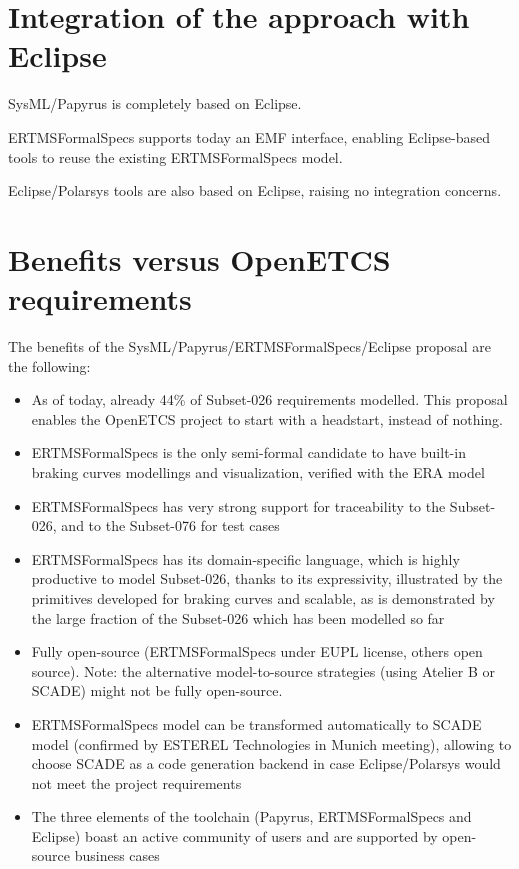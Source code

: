\section{Integration of the approach with Eclipse}

SysML/Papyrus is completely based on Eclipse.

ERTMSFormalSpecs supports today an EMF interface, enabling Eclipse-based tools to reuse the existing ERTMSFormalSpecs model. 

Eclipse/Polarsys tools are also based on Eclipse, raising no integration concerns.

\section{Benefits versus OpenETCS requirements}

The benefits of the SysML/Papyrus/ERTMSFormalSpecs/Eclipse proposal are the following:

\begin{itemize}
	\item As of today, already 44\% of Subset-026 requirements modelled. This proposal enables the OpenETCS project to start with a headstart, instead of nothing.
	\item ERTMSFormalSpecs is the only semi-formal candidate to have built-in braking curves modellings and visualization, verified with the ERA model
	\item ERTMSFormalSpecs has very strong support for traceability to the Subset-026, and to the Subset-076 for test cases
	\item ERTMSFormalSpecs has its domain-specific language, which is highly productive to model Subset-026, thanks to its expressivity, illustrated by the primitives
developed for braking curves and scalable, as is demonstrated by the large fraction of the Subset-026 which has been modelled so far
	\item Fully open-source (ERTMSFormalSpecs under EUPL license, others open source). Note: the alternative model-to-source strategies (using Atelier B or SCADE)  might not be fully open-source. 
	\item ERTMSFormalSpecs model can be transformed automatically to SCADE model (confirmed by ESTEREL Technologies in Munich meeting), allowing to choose SCADE as a code generation backend in case Eclipse/Polarsys would not meet the project requirements
	\item The three elements of the toolchain (Papyrus, ERTMSFormalSpecs and Eclipse) boast an active community of users and are supported by open-source business cases
\end{itemize}

